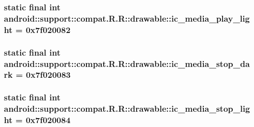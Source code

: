 \hypertarget{classandroid_1_1support_1_1compat_1_1_r_1_1drawable_f62d2291d369990ed39beadae47a3d10}{
\subsubsection[{ic\_\-media\_\-play\_\-light}]{\setlength{\rightskip}{0pt plus 5cm}static final int android::support::compat.R.R::drawable::ic\_\-media\_\-play\_\-light = 0x7f020082}}
\label{classandroid_1_1support_1_1compat_1_1_r_1_1drawable_f62d2291d369990ed39beadae47a3d10}


\hypertarget{classandroid_1_1support_1_1compat_1_1_r_1_1drawable_f81ae5e975725f130057d7e021557c6e}{
\subsubsection[{ic\_\-media\_\-stop\_\-dark}]{\setlength{\rightskip}{0pt plus 5cm}static final int android::support::compat.R.R::drawable::ic\_\-media\_\-stop\_\-dark = 0x7f020083}}
\label{classandroid_1_1support_1_1compat_1_1_r_1_1drawable_f81ae5e975725f130057d7e021557c6e}


\hypertarget{classandroid_1_1support_1_1compat_1_1_r_1_1drawable_1a4cf351ab868e917a11662709dbf61b}{
\subsubsection[{ic\_\-media\_\-stop\_\-light}]{\setlength{\rightskip}{0pt plus 5cm}static final int android::support::compat.R.R::drawable::ic\_\-media\_\-stop\_\-light = 0x7f020084}}
\label{classandroid_1_1support_1_1compat_1_1_r_1_1drawable_1a4cf351ab868e917a11662709dbf61b}


